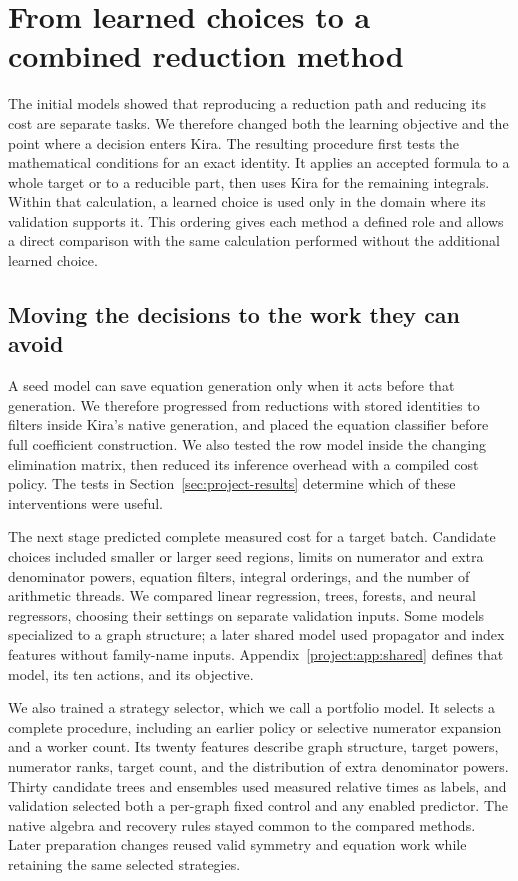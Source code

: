 \section{From learned choices to a combined reduction method}
\label{sec:method}
The initial models showed that reproducing a reduction path and reducing its cost are separate tasks. We therefore changed both the learning objective and the point where a decision enters Kira. The resulting procedure first tests the mathematical conditions for an exact identity. It applies an accepted formula to a whole target or to a reducible part, then uses Kira for the remaining integrals. Within that calculation, a learned choice is used only in the domain where its validation supports it. This ordering gives each method a defined role and allows a direct comparison with the same calculation performed without the additional learned choice.

\subsection{Moving the decisions to the work they can avoid}
A seed model can save equation generation only when it acts before that generation. We therefore progressed from reductions with stored identities to filters inside Kira's native generation, and placed the equation classifier before full coefficient construction. We also tested the row model inside the changing elimination matrix, then reduced its inference overhead with a compiled cost policy. The tests in Section~\ref{sec:project-results} determine which of these interventions were useful.

The next stage predicted complete measured cost for a target batch. Candidate choices included smaller or larger seed regions, limits on numerator and extra denominator powers, equation filters, integral orderings, and the number of arithmetic threads. We compared linear regression, trees, forests, and neural regressors, choosing their settings on separate validation inputs. Some models specialized to a graph structure; a later shared model used propagator and index features without family-name inputs. Appendix~\ref{project:app:shared} defines that model, its ten actions, and its objective.

We also trained a strategy selector, which we call a portfolio model. It selects a complete procedure, including an earlier policy or selective numerator expansion and a worker count. Its twenty features describe graph structure, target powers, numerator ranks, target count, and the distribution of extra denominator powers. Thirty candidate trees and ensembles used measured relative times as labels, and validation selected both a per-graph fixed control and any enabled predictor. The native algebra and recovery rules stayed common to the compared methods. Later preparation changes reused valid symmetry and equation work while retaining the same selected strategies.

